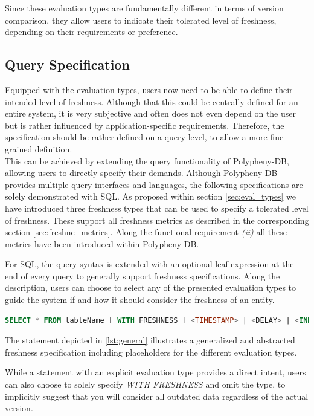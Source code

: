 Since these evaluation types are fundamentally different in terms of version comparison, they
allow users to indicate their tolerated level of freshness, depending on their requirements or preference. 



\subsection{Query Specification}
\label{sec:fresh_spec}

Equipped with the evaluation types, users now need to be able to define their intended level of freshness.
Although that this could be centrally defined for an entire system, it is very subjective and often does not even depend on the user
but is rather influenced by application-specific requirements.
Therefore, the specification should be rather defined on a query level, to allow a more fine-grained definition.\\

This can be achieved by extending the query functionality of Polypheny-DB, allowing users to directly specify their demands.
Although Polypheny-DB provides multiple query interfaces and languages, the following specifications are solely demonstrated with SQL. 
As proposed within section \ref{sec:eval_types} we have introduced three freshness types that can be used to specify a tolerated level of freshness.
These support all freshness metrics as described in the corresponding section \ref{sec:freshne_metrics}. Along the functional 
requirement \textit{(ii)} all these metrics have been introduced within Polypheny-DB.

For SQL, the query syntax is extended  with an optional leaf expression at the end of every query to generally support freshness specifications. 
Along the description, users can choose to select any of the presented evaluation types to guide the system if and how it should consider the freshness of an entity.
\begin{lstlisting}[language=sql, caption={Generalized Freshness Specification},label={lst:general}]
SELECT * FROM tableName [ WITH FRESHNESS [ <TIMESTAMP> | <DELAY> | <INDEX> ] ];
\end{lstlisting}

The statement depicted in \ref{lst:general} illustrates a generalized and abstracted freshness specification including placeholders for the different evaluation types.

While a statement with an explicit evaluation type provides a direct intent, users can also choose to solely specify \emph{WITH FRESHNESS} 
and omit the type, to implicitly suggest that you will consider all outdated data regardless of the actual version.





